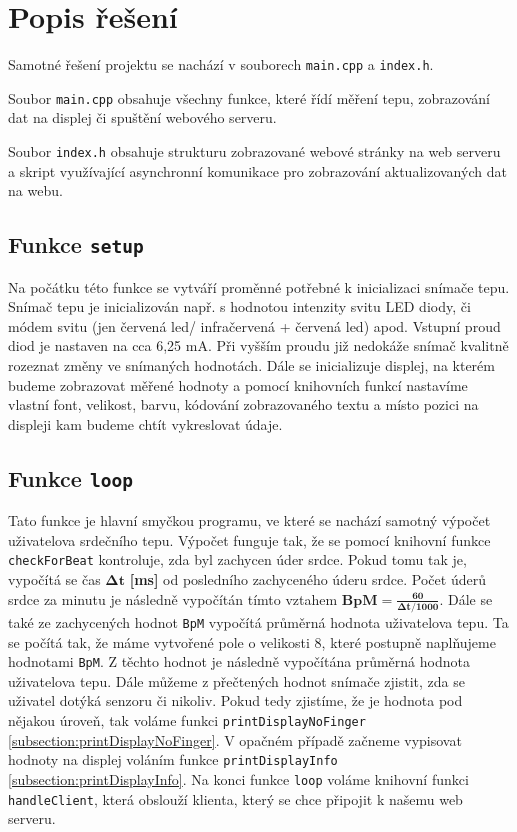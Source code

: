 \documentclass[12pt, a4paper]{article}
\begin{document}
    \section{Popis řešení}
    Samotné řešení projektu se nachází v souborech \texttt{main.cpp} a \texttt{index.h}.

    
    Soubor \texttt{main.cpp} obsahuje všechny funkce, které řídí měření tepu, zobrazování dat na displej či spuštění webového serveru.

    Soubor \texttt{index.h} obsahuje strukturu zobrazované webové stránky na web serveru a skript využívající asynchronní komunikace pro zobrazování aktualizovaných dat na webu.
    \subsection{Funkce \texttt{setup}}
    Na počátku této funkce se vytváří proměnné potřebné k inicializaci snímače tepu. Snímač tepu je inicializován např. s hodnotou intenzity svitu LED diody, či módem svitu (jen červená led/ infračervená + červená led) apod. Vstupní proud diod je nastaven na cca 6,25 mA. Při vyšším proudu již nedokáže snímač kvalitně rozeznat změny ve snímaných hodnotách. Dále se inicializuje displej, na kterém budeme zobrazovat měřené hodnoty a pomocí knihovních funkcí nastavíme vlastní font, velikost, barvu, kódování zobrazovaného textu a místo pozici na displeji kam budeme chtít vykreslovat údaje.
    
    \subsection{Funkce \texttt{loop}}
    Tato funkce je hlavní smyčkou programu, ve které se nachází samotný výpočet uživatelova srdečního tepu. Výpočet funguje tak, že se pomocí knihovní funkce \texttt{checkForBeat} kontroluje, zda byl zachycen úder srdce. Pokud tomu tak je, vypočítá se čas $\bm{\Delta t}$ \textbf{[ms]} od posledního zachyceného úderu srdce. Počet úderů srdce za minutu je následně vypočítán tímto vztahem $\bm{BpM = \frac{60}{\Delta t / 1000}}$.\newline
    Dále se také ze zachycených hodnot \texttt{BpM} vypočítá průměrná hodnota uživatelova tepu. Ta se počítá tak, že máme vytvořené pole o velikosti 8, které postupně naplňujeme hodnotami \texttt{BpM}. Z těchto hodnot je následně vypočítána průměrná hodnota uživatelova tepu.
    Dále můžeme z přečtených hodnot snímače zjistit, zda se uživatel dotýká senzoru či nikoliv. Pokud tedy zjistíme, že je hodnota pod nějakou úroveň, tak voláme funkci \texttt{printDisplayNoFinger} \ref{subsection:printDisplayNoFinger}. V opačném případě začneme vypisovat hodnoty na displej voláním funkce \texttt{printDisplayInfo} \ref{subsection:printDisplayInfo}. Na konci funkce \texttt{loop} voláme knihovní funkci \texttt{handleClient}, která obslouží klienta, který se chce připojit k našemu web serveru.
    
\end{document}
